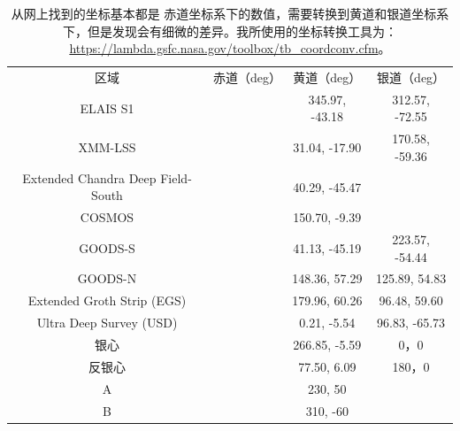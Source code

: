 \begin{table}
  \centering
  \renewcommand{\arraystretch}{1.15}
  \begin{tabular}{cccc}
      \toprule
      区域  & 赤道（deg） & 黄道（deg） & 银道（deg） \\
      \cmidrule{1-1} \cmidrule{2-2} \cmidrule{3-3} \cmidrule{4-4}
      ELAIS S1 & & 345.97, -43.18 & 312.57, -72.55 \\
      XMM-LSS & & 31.04, -17.90 & 170.58, -59.36 \\
      Extended Chandra Deep Field-South & & 40.29, -45.47 & \\
      COSMOS & & 150.70, -9.39 & \\
      GOODS-S & & 41.13, -45.19 & 223.57, -54.44 \\
      GOODS-N & & 148.36, 57.29 & 125.89, 54.83 \\
      Extended Groth Strip (EGS) & & 179.96, 60.26 & 96.48, 59.60 \\
      Ultra Deep Survey (USD) & & 0.21, -5.54 & 96.83, -65.73 \\
      银心 & & 266.85, -5.59 & 0，0\\
      反银心 & & 77.50, 6.09 & 180，0\\
      A & & 230, 50 & \\
      B & & 310, -60 & \\
      \bottomrule
  \end{tabular}
  \caption{从网上找到的坐标基本都是
   赤道坐标系下的数值，需要转换到黄道和银道坐标系下，但是发现会有细微的差异。我所使用的坐标转换工具为：
  \url{https://lambda.gsfc.nasa.gov/toolbox/tb_coordconv.cfm}。}
  \label{tab:ultra_deep_areas}
\end{table}

